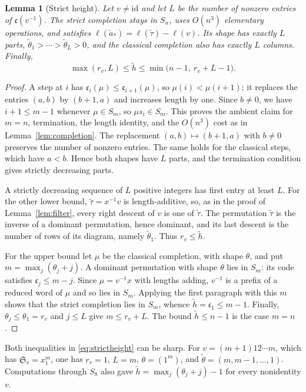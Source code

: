 \documentclass{amsart}
\newtheorem{lemma}[theorem]{Lemma}
\theoremstyle{definition}
\theoremstyle{remark}
\numberwithin{equation}{section}
\newcommand{\Sch}{\mathfrak S}
\newcommand{\code}{\mathfrak c}
\newcommand{\id}{\mathrm{id}}
\begin{document}
\begin{lemma}[Strict height]\label{lem:strict}
Let $v\ne\id$ and let $L$ be the number of nonzero entries of
$\code(v^{-1})$.
The strict completion stays in $S_n$, uses $O(n^3)$ elementary
operations, and satisfies
$\ell(\tilde a_*)=\ell(\tilde\tau)-\ell(v)$.
Its shape has exactly $L$ parts,
$\tilde\theta_1>\cdots>\tilde\theta_L>0$,
and the classical completion also has exactly $L$ columns.
Finally,
\begin{equation}\label{eq:strictheight}
 \max(r_v,L)\leq\tilde h\leq
 \min\bigl(n-1,\ r_v+L-1\bigr).
\end{equation}
\end{lemma}
\begin{proof}
A step at $i$ has $\code_i(\mu)\leq\code_{i+1}(\mu)$, so
$\mu(i)<\mu(i+1)$; it replaces the entries $(a,b)$ by $(b+1,a)$ and
increases length by one.
Since $b\neq0$, we have $i+1\leq m-1$ whenever $\mu\in S_m$, so
$\mu s_i\in S_m$.
This proves the ambient claim for $m=n$, termination, the length identity,
and the $O(n^3)$ cost as in Lemma~\ref{lem:completion}.
The replacement $(a,b)\mapsto(b+1,a)$ with $b\neq0$ preserves the
number of nonzero entries. The same holds for the classical steps,
which have $a<b$.
Hence both shapes have $L$ parts, and the termination condition gives
strictly decreasing parts.

A strictly decreasing sequence of $L$ positive integers has first entry at
least $L$.
For the other lower bound, $\tilde\tau=x^{-1}v$ is length-additive,
so, as in the proof of Lemma~\ref{lem:filter}, every right descent of
$v$ is one of $\tilde\tau$.
The permutation $\tilde\tau$ is the inverse of a dominant permutation,
hence dominant, and its last descent is the number of rows of its
diagram, namely $\tilde\theta_1$.
Thus $r_v\leq\tilde h$.

For the upper bound let $\mu$ be the classical completion, with shape
$\theta$, and put $m=\max_j(\theta_j+j)$.
A dominant permutation with shape $\theta$ lies in $S_m$:
its code satisfies $\code_j\leq m-j$.
Since $\mu=v^{-1}x$ with lengths adding, $v^{-1}$ is a prefix of a
reduced word of $\mu$ and so lies in $S_m$.
Applying the first paragraph with this $m$ shows that the strict
completion lies in $S_m$, whence $\tilde h=\code_1\leq m-1$.
Finally, $\theta_j\leq\theta_1=r_v$ and $j\leq L$ give
$m\leq r_v+L$. The bound $\tilde h\leq n-1$ is the case $m=n$.
\end{proof}

Both inequalities in \eqref{eq:strictheight} can be sharp.
For $v=(m+1)12\cdots m$, which has $\Sch_v=x_1^m$, one has $r_v=1$,
$L=m$, $\theta=(1^m)$, and $\tilde\theta=(m,m-1,\ldots,1)$.
Computations through $S_8$ also gave
$\tilde h=\max_j(\theta_j+j)-1$ for every nonidentity $v$.
\end{document}
